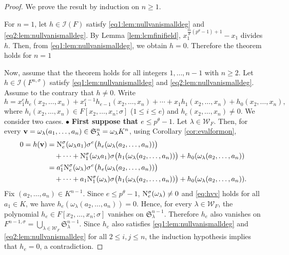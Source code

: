 \documentclass[11pt,reqno]{amsart}
\theoremstyle{definition}
\begin{document}
\begin{proof}
We prove the result by induction on $n \geq 1$. 

For $n=1$, let $h \in \mathscr{I}(F)$ satisfy \eqref{eq1:lem:nullvanismalldeg} and \eqref{eq2:lem:nullvanismalldeg}. By Lemma \ref{lem:lcmfinifield}, $x_1^{\frac{m}{\theta}(p^\theta-1)+1}-x_1$ divides $h$. Then, from \eqref{eq1:lem:nullvanismalldeg}, we obtain $h=0$. Therefore the theorem holds for $n=1$

Now, assume that the theorem holds for all integers $1,\dots,n-1$ with $n \geq 2$. Let $h \in \mathscr{I}(F^{n,\sigma})$ satisfy \eqref{eq1:lem:nullvanismalldeg} and \eqref{eq2:lem:nullvanismalldeg}. Assume to the contrary that $h \neq 0$. Write 
$$h=x_1^e h_{e}(x_2,\dots,x_n)+x_1^{e-1} h_{e-1}(x_2,\dots,x_n)+\cdots+x_1 h_{1}(x_2,\dots,x_n)+ h_{0}(x_2,\dots,x_n),
$$ where $h_i(x_2,\dots,x_n) \in F[x_2,\dots,x_n;\sigma]$ ($1 \leq i \leq e$) and $h_e(x_2,\dots,x_n)\neq 0$. We consider two cases.
\vskip 1mm
\noindent
$\bullet$ {\bf First suppose that $e\leq p^\theta-1$}. Let $\lambda \in \mathscr{W}_F$. Then, for every ${\bf v}=\omega_\lambda (a_1,\dots,a_n)\in \mathfrak{S}_{\lambda}^n= \omega_\lambda K^n$, using Corollary \ref{cor:evalformon},
\begin{equation}\label{eq:hvv}
\begin{aligned}
0=h({\bf v})
&={\rm N}^\sigma_e(\omega_\lambda a_1)
  \sigma^e\big(h_e(\omega_\lambda(a_2,\dots,a_n))\big)\\
&\quad+\cdots+{\rm N}^\sigma_1(\omega_\lambda a_1)
  \sigma\big(h_1(\omega_\lambda(a_2,\dots,a_n))\big)
  +h_0(\omega_\lambda(a_2,\dots,a_n))\\
&=a_1^e {\rm N}^\sigma_e(\omega_\lambda)
  \sigma^e\big(h_e(\omega_\lambda(a_2,\dots,a_n))\big)\\
&\quad+\cdots+a_1{\rm N}^\sigma_1(\omega_\lambda)
  \sigma\big(h_1(\omega_\lambda(a_2,\dots,a_n))\big)
  +h_0(\omega_\lambda(a_2,\dots,a_n)).
\end{aligned}
\end{equation} Fix $(a_2,\dots,a_n) \in K^{n-1}$. Since $e \leq p^\theta-1$, ${\rm N}^\sigma_e(\omega_\lambda) \neq 0$ and \eqref{eq:hvv} holds for all $a_1 \in K$, we have $h_e(\omega_{\lambda}(a_2,\dots,a_n))=0$. Hence, for every $\lambda \in \mathscr{W}_F$, the polynomial $h_e \in F[x_2,\dots,x_n;\sigma]$ vanishes on $\mathfrak{S}_{\lambda}^{n-1}$. Therefore $h_e$ also vanishes on $F^{n-1,\sigma}=\bigcup_{\lambda \in \mathscr{W}_F} \mathfrak{S}_{\lambda}^{n-1}$. Since $h_e$ also satisfies \eqref{eq1:lem:nullvanismalldeg} and \eqref{eq2:lem:nullvanismalldeg} for all $2 \leq i,j \leq n$, the induction hypothesis implies that $h_e=0$, a contradiction.

\end{proof}
\end{document}
